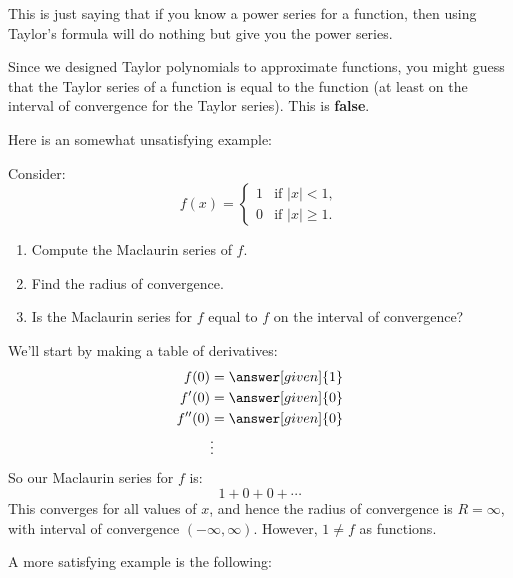 \documentclass{ximera}
\begin{document}
This is just saying that if you know a power series for a function,
then using Taylor's formula will do nothing but give you the power
series.

\begin{warning}
  Since we designed Taylor polynomials to approximate functions, you
  might guess that the Taylor series of a function is equal to the
  function (at least on the interval of convergence for the Taylor
  series).  This is \textbf{false}.
\end{warning}

Here is an somewhat unsatisfying example:

\begin{example}
  Consider:
  \[
  f(x) = \begin{cases}
    1 &\text{if $|x|<1$},\\
    0 &\text{if $|x|\ge 1$}.
  \end{cases}
  \]
  \begin{enumerate}
  \item Compute the Maclaurin series of $f$.
  \item Find the radius of convergence.
  \item Is the Maclaurin series for $f$ equal to $f$ on the interval of convergence?
  \end{enumerate}
  \begin{explanation}
   We'll start by making a table of derivatives:
   \begin{align*}
     f(0)   &= \answer[given]{1}\\
     f'(0)  &= \answer[given]{0}\\
     f''(0) &=\answer[given]{0}\\
     &\vdots
   \end{align*}
   So our Maclaurin series for $f$ is:
    \[
    1+0+0+\cdots
    \]
    This converges for all values of $x$, and hence the radius of
    convergence is $R=\infty$, with interval of convergence
    $(-\infty,\infty)$. However, $1\ne f$ as functions.
\end{explanation}
\end{example}


A more satisfying example is the following:
\end{document}
